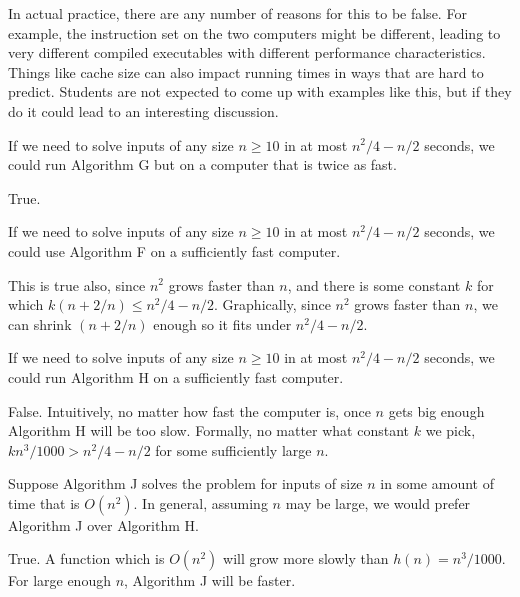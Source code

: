 \documentclass{tufte-handout}
\begin{document}
\begin{questions}
\begin{subquestions}
\begin{answer}
        In actual practice, there are any number of reasons for this
        to be false.  For example, the instruction set on the two
        computers might be different, leading to very different
        compiled executables with different performance
        characteristics.  Things like cache size can also impact
        running times in ways that are hard to predict.  Students are
        not expected to come up with examples like this, but if they
        do it could lead to an interesting discussion.
      \end{answer}
    \item If we need to solve inputs of any size $n \geq 10$ in at most
      $n^2/4 - n/2$ seconds, we could run Algorithm G but on a computer
      that is twice as fast.
      \begin{answer}
        True.
      \end{answer}
    \item If we need to solve inputs of any size $n \geq 10$ in at most
      $n^2/4 - n/2$ seconds, we could use Algorithm F on a sufficiently
      fast computer.
      \begin{answer}
        This is true also, since $n^2$ grows faster than $n$, and
        there is some constant $k$ for which
        $k(n + 2/n) \leq n^2/4 - n/2$.  Graphically, since $n^2$ grows
        faster than $n$, we can shrink $(n + 2/n)$ enough so it fits
        under $n^2/4 - n/2$.
      \end{answer}
    \item If we need to solve inputs of any size $n \geq 10$ in at most
      $n^2/4 - n/2$ seconds, we could run Algorithm H on a sufficiently
      fast computer.
      \begin{answer}
        False.  Intuitively, no matter how fast the computer is, once
        $n$ gets big enough Algorithm H will be too slow.  Formally,
        no matter what constant $k$ we pick, $kn^3/1000 > n^2/4 - n/2$
        for some sufficiently large $n$.
      \end{answer}
    \item Suppose Algorithm J solves the problem for inputs of size
      $n$ in some amount of time that is $O(n^2)$.  In general,
      assuming $n$ may be large, we would prefer Algorithm J over
      Algorithm H.
      \begin{answer}
        True.  A function which is $O(n^2)$ will grow more slowly than
        $h(n) = n^3/1000$.  For large enough $n$, Algorithm J will be
        faster.
      \end{answer}
  \end{subquestions}


\end{questions}
\end{document}
